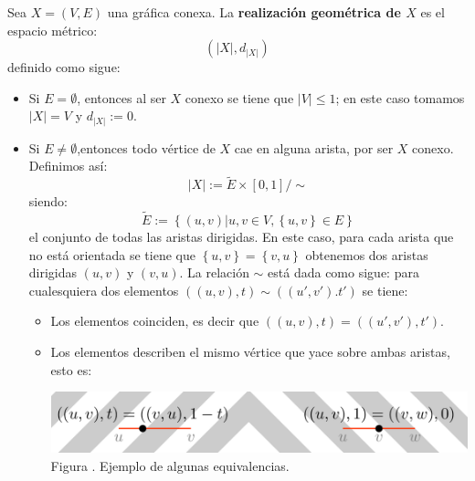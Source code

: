 \documentclass[12pt]{report}
\newcounter{it}
\theoremstyle{largebreak}
\newcommand\abs[1]{\ensuremath{\left|#1\right|}}
\newcounter{figcount}
\begin{document}
    \begin{mydef}
        Sea $X=(V,E)$ una gráfica conexa. La \textbf{realización geométrica de $X$} es el espacio métrico:
        \begin{equation*}
            (\abs{X},d_{\abs{X}})
        \end{equation*}
        definido como sigue:
        \begin{itemize}
            \item Si $E=\emptyset$, entonces al ser $X$ conexo se tiene que $\abs{V}\leq 1$; en este caso tomamos $\abs{X}=V$ y $d_{\abs{X}}:=0$.
            \item Si $E\neq\emptyset$,entonces todo vértice de $X$ cae en alguna arista, por ser $X$ conexo. Definimos así:
            \begin{equation*}
                \abs{X}:=\widetilde{E}\times[0,1]/\sim
            \end{equation*}
            siendo:
            \begin{equation*}
                \widetilde{E}:=\left\{(u,v)\Big|u,v\in V, \left\{u,v\right\}\in E \right\}
            \end{equation*}
            el conjunto de todas las aristas dirigidas. En este caso, para cada arista que no está orientada se tiene que $\left\{u,v\right\}=\left\{v,u\right\}$ obtenemos dos aristas dirigidas $(u,v)$ y $(v,u)$. La relación $\sim$ está dada como sigue: para cualesquiera dos elementos $((u,v),t)\sim((u',v').t')$ se tiene:
            \begin{itemize}
                \item Los elementos coinciden, es decir que $((u,v),t)=((u',v'),t')$.
                \item Los elementos describen el mismo vértice que yace sobre ambas aristas, esto es:
                
                \begin{minipage}{\textwidth}
                    \begin{center}
                        \includegraphics[scale=0.25]{images/relation_clara.png}\\
                        Figura \thefigcount. Ejemplo de algunas equivalencias.
                    \end{center}
                \end{minipage}


\end{itemize}
\end{itemize}
\end{mydef}
\end{document}
